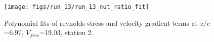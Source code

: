 \begin{figure}[H]
\centering
\texttt{[image: figs/run\_13/run\_13\_nut\_ratio\_fit]}
\caption{Polynomial fits of reynolds stress and velocity gradient terms at $z/c$=6.97, $V_{free}$=19.03, station 2.}
\label{fig:run_13_nut_ratio_fit}
\end{figure}


